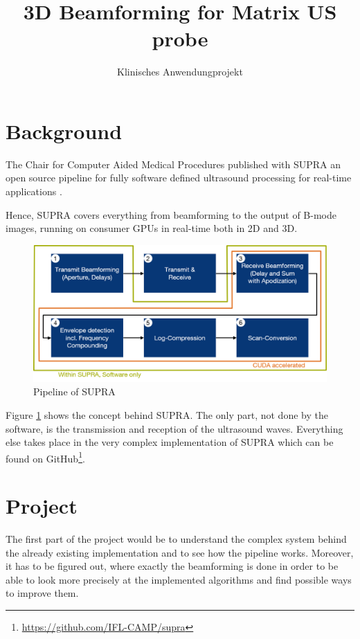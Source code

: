 \documentclass[12pt,a4paper,oneside]{scrartcl}
\title{3D Beamforming for Matrix US probe}
\subtitle{Klinisches Anwendungprojekt}
\date{\formatdate{14}{10}{2019}}
\begin{document}
\maketitle

\section{Background}

The Chair for Computer Aided Medical Procedures published with SUPRA an open source pipeline for fully software defined ultrasound processing for real-time applications \cite{Goebl2018supra}.

Hence, SUPRA covers everything from beamforming to the output of B-mode images, running on consumer GPUs in real-time both in 2D and 3D.

\begin{figure}[h!]
\begin{center}
\includegraphics[width = \textwidth ]{Bilder/UsPipeline_color.png}
\caption[Pipeline of SUPRA]{Pipeline of SUPRA}
\label{Pipeline}
\end{center}
\end{figure}

Figure \ref{Pipeline} shows the concept behind SUPRA. The only part, not done by the software, is the transmission and reception of the ultrasound waves. Everything else takes place in the very complex implementation of SUPRA which can be found on GitHub\footnote{\url{https://github.com/IFL-CAMP/supra}}.

\section{Project}

The first part of the project would be to understand the complex system behind the already existing implementation and to see how the pipeline works.
Moreover, it has to be figured out, where exactly the beamforming is done in order to be able to look more precisely at the implemented algorithms and find possible ways to improve them.
\end{document}
